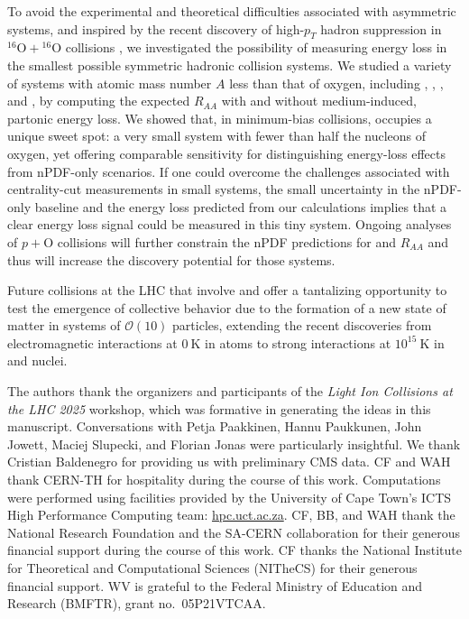 \documentclass[%
 reprint,
 amsmath,amssymb,
 aps,
 prl,nofootinbib,
 superscriptaddress
]{revtex4-2}
\begin{document}
To avoid the experimental and theoretical difficulties associated with asymmetric systems, and inspired by the recent discovery of high-$p_T$ hadron suppression in ${}^{16}\mathrm{O} + {}^{16}\mathrm{O}$ collisions \cite{CMS:2025bta}, we investigated the possibility of measuring energy loss in the smallest possible symmetric hadronic collision systems.
We studied a variety of systems with atomic mass number $A$ less than that of oxygen, including , , \li, and \bt, by computing the expected $R_{AA}$ with and without medium-induced, partonic energy loss. 
We showed that, in minimum-bias collisions, \lili{} occupies a unique sweet spot: a very small system with fewer than half the nucleons of oxygen, yet offering comparable sensitivity for distinguishing energy-loss effects from nPDF-only scenarios.
If one could overcome the challenges associated with centrality-cut measurements in small systems, the small uncertainty in the  nPDF-only baseline and the energy loss predicted from our calculations implies that a clear energy loss signal could be measured in this tiny system. 
Ongoing analyses of $p + \mathrm{O}$ collisions will further constrain the nPDF predictions for  and \lili{} $R_{AA}$ and thus will increase the discovery potential for those systems.





Future collisions at the LHC that involve \li{} and  offer a tantalizing opportunity to test the emergence of collective behavior due to the formation of a new state of matter in systems of $\mathcal{O}(10)$ particles, extending the recent discoveries from electromagnetic interactions at $0 ~\mathrm{K}$ in \li{} atoms to strong interactions at $10^{15}~ \mathrm{K}$ in \li{} and  nuclei.












 The authors thank the organizers and participants of the \textit{Light Ion Collisions at the LHC 2025} workshop, which was formative in generating the ideas in this manuscript. Conversations with Petja Paakkinen, Hannu Paukkunen, John Jowett, Maciej Slupecki, and Florian Jonas were particularly insightful. We thank Cristian Baldenegro for providing us with preliminary CMS data. CF and WAH thank CERN-TH for hospitality during the course of this work. Computations were performed using facilities provided by the University of Cape Town’s ICTS High Performance Computing team: \href{http://hpc.uct.ac.za}{hpc.uct.ac.za}. CF, BB, and WAH thank the National Research Foundation and the SA-CERN collaboration for their generous financial support during the course of this work. CF thanks the National Institute for Theoretical and Computational Sciences (NITheCS) for their generous financial support.
WV is grateful to the Federal Ministry of Education and Research (BMFTR), grant no.\ 05P21VTCAA.
\end{document}
